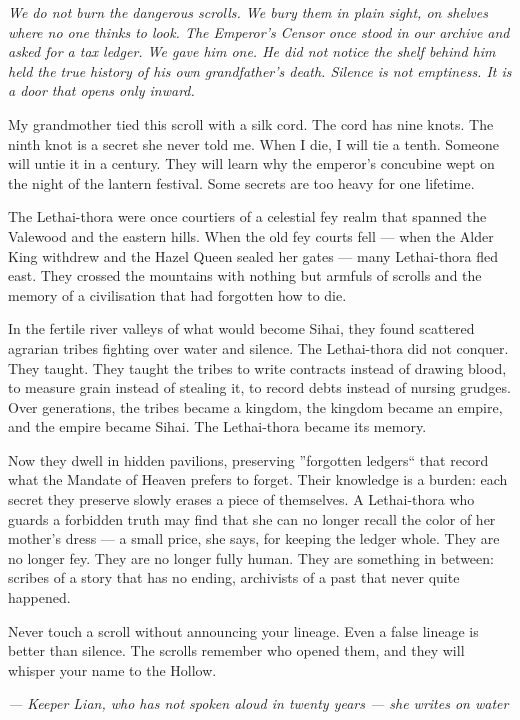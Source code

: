 \noindent
{\Large
\textit{We do not burn the dangerous scrolls. We bury them in plain sight, on shelves where no one thinks to look. The Emperor's Censor once stood in our archive and asked for a tax ledger. We gave him one. He did not notice the shelf behind him held the true history of his own grandfather's death. Silence is not emptiness. It is a door that opens only inward.}

\vspace{0.5em}

My grandmother tied this scroll with a silk cord. The cord has nine knots. The ninth knot is a secret she never told me. When I die, I will tie a tenth. Someone will untie it in a century. They will learn why the emperor's concubine wept on the night of the lantern festival. Some secrets are too heavy for one lifetime.

\vspace{0.5em}

The Lethai-thora were once courtiers of a celestial fey realm that spanned the Valewood and the eastern hills. When the old fey courts fell --- when the Alder King withdrew and the Hazel Queen sealed her gates --- many Lethai-thora fled east. They crossed the mountains with nothing but armfuls of scrolls and the memory of a civilisation that had forgotten how to die.

In the fertile river valleys of what would become Sihai, they found scattered agrarian tribes fighting over water and silence. The Lethai-thora did not conquer. They taught. They taught the tribes to write contracts instead of drawing blood, to measure grain instead of stealing it, to record debts instead of nursing grudges. Over generations, the tribes became a kingdom, the kingdom became an empire, and the empire became Sihai. The Lethai-thora became its memory.

Now they dwell in hidden pavilions, preserving ''forgotten ledgers`` that record what the Mandate of Heaven prefers to forget. Their knowledge is a burden: each secret they preserve slowly erases a piece of themselves. A Lethai-thora who guards a forbidden truth may find that she can no longer recall the color of her mother's dress --- a small price, she says, for keeping the ledger whole. They are no longer fey. They are no longer fully human. They are something in between: scribes of a story that has no ending, archivists of a past that never quite happened.

\vspace{0.5em}

Never touch a scroll without announcing your lineage. Even a false lineage is better than silence. The scrolls remember who opened them, and they will whisper your name to the Hollow.

\vspace{1em}

\noindent\textit{--- Keeper Lian, who has not spoken aloud in twenty years --- she writes on water}
}

